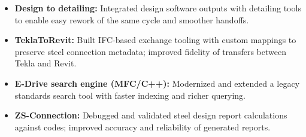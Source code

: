 \documentclass[12pt,a4paper]{MKResume}
\begin{document}
\begin{projects}
\begin{itemize}[leftmargin=1em,labelsep=0.5em]
        \item \textbf{Design to detailing:} Integrated design software outputs with detailing tools to enable easy rework of the same cycle and smoother handoffs.
        \item \textbf{TeklaToRevit:} Built IFC-based exchange tooling with custom mappings to preserve steel connection metadata; improved fidelity of transfers between Tekla and Revit.
        \item \textbf{E-Drive search engine (MFC/C++):} Modernized and extended a legacy standards search tool with faster indexing and richer querying.
        \item \textbf{ZS-Connection:} Debugged and validated steel design report calculations against codes; improved accuracy and reliability of generated reports.
    \end{itemize}
\end{projects}
\end{document}
